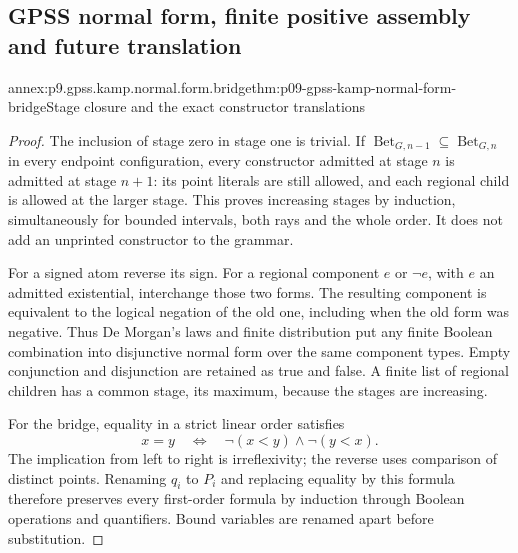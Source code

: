 
\subsection{GPSS normal form, finite positive assembly and future translation}
\label{sec:annex-p09-gpss-special-normal-form}

\begin{annexitem}{annex:p9.gpss.kamp.normal.form.bridge}{thm:p09-gpss-kamp-normal-form-bridge}{Stage closure and the exact constructor translations}
\begin{proof}
The inclusion of stage zero in stage one is trivial. If
\(\operatorname{Bet}_{G,n-1}\subseteq\operatorname{Bet}_{G,n}\)
in every endpoint configuration, every constructor admitted at
stage \(n\) is admitted at stage \(n+1\): its point literals
are still allowed, and each regional child is allowed at the
larger stage. This proves increasing stages by induction,
simultaneously for bounded intervals, both rays and the whole
order. It does not add an unprinted constructor to the grammar.

For a signed atom reverse its sign. For a regional component
\(e\) or \(\neg e\), with \(e\) an admitted existential,
interchange those two forms. The resulting component is equivalent
to the logical negation of the old one, including when the old
form was negative. Thus De Morgan's laws and finite distribution
put any finite Boolean combination into disjunctive normal form
over the same component types. Empty conjunction and disjunction
are retained as true and false. A finite list of regional children
has a common stage, its maximum, because the stages are increasing.

For the bridge, equality in a strict linear order satisfies
\[
                 x=y\quad\Longleftrightarrow\quad
                          \neg(x<y)\land\neg(y<x).
\]
The implication from left to right is irreflexivity; the reverse
uses comparison of distinct points. Renaming \(q_i\) to
\(P_i\) and replacing equality by this formula therefore
preserves every first-order formula by induction through Boolean
operations and quantifiers. Bound variables are renamed apart
before substitution.


\end{proof}
\end{annexitem}
